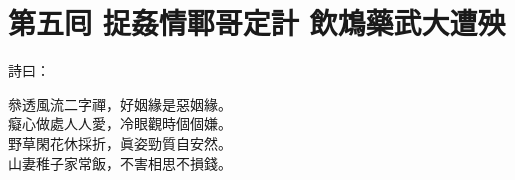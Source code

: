 
\chapter*{第五囘 捉姦情鄆哥定計 飲鴆藥武大遭殃}


詩曰：

\begin{myquote} 
叅透風流二字禪，好姻緣是惡姻緣。\\癡心做處人人愛，冷眼觀時個個嫌。\\野草閑花休採折，眞姿勁質自安然。\\山妻稚子家常飯，不害相思不損錢。
\end{myquote} 

